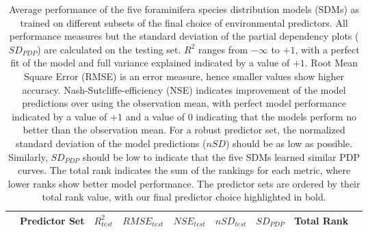 
\begin{table}[h]
\centering
\caption{Average performance of the five foraminifera species distribution models (SDMs) as trained on different subsets of the final choice of environmental predictors. All performance measures but the standard deviation of the partial dependency plots ($SD_{PDP}$) are calculated on the testing set. $R^2$ ranges from $-\infty$ to $+1$, with a perfect fit of the model and full variance explained indicated by a value of $+1$. Root Mean Square Error (RMSE) is an error measure, hence smaller values show higher accuracy. Nash-Sutcliffe-efficiency (NSE) indicates improvement of the model predictions over using the observation mean, with perfect model performance indicated by a value of $+1$ and a value of 0 indicating that the models perform no better than the observation mean. For a robust predictor set, the normalized standard deviation of the model predictions ($nSD$) should be as low as possible. Similarly, $SD_{PDP}$ should be low to indicate that the five SDMs learned similar PDP curves. The total rank indicates the sum of the rankings for each metric, where lower ranks show better model performance. The predictor sets are ordered by their total rank value, with our final predictor choice highlighted in bold.\\}\label{tab:model_performance_foram_predictor_sets}
\small
\begin{tabularx}{\textwidth}{lXlllllll}

\toprule
   & Predictor Set                                                              & $R^2_{test}$ & $RMSE_{test}$ & $NSE_{test}$ & $nSD_{test}$ & $SD_{PDP}$ & Total Rank \\ \midrule \midrule
   

\end{tabularx}
\end{table}
